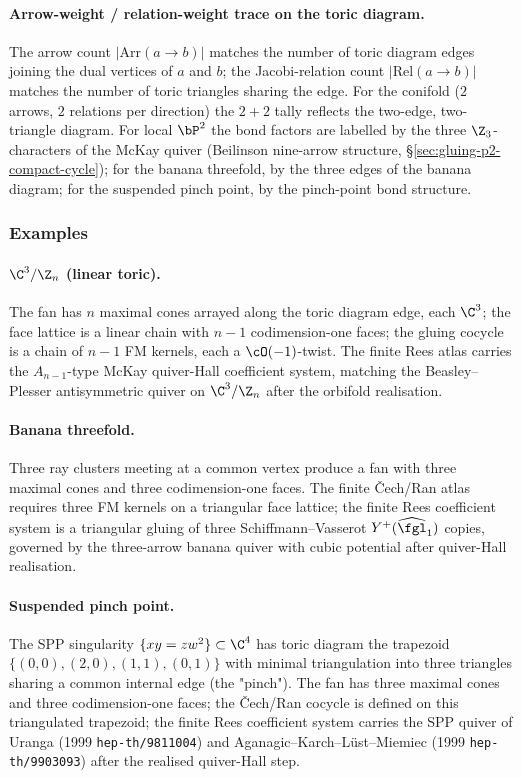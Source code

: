 \paragraph{Arrow-weight / relation-weight trace on the toric diagram.}
The arrow count $|\mathrm{Arr}(a \to b)|$ matches the number of toric
diagram edges joining the dual vertices of $a$ and $b$; the
Jacobi-relation count $|\mathrm{Rel}(a \to b)|$ matches the number of
toric triangles sharing the edge. For the conifold ($2$ arrows, $2$
relations per direction) the $2 + 2$ tally reflects the two-edge,
two-triangle diagram. For local $\bP^2$ the bond factors are labelled
by the three $\Z_3$-characters of the McKay quiver (Beilinson nine-arrow
structure, \S\ref{sec:gluing-p2-compact-cycle}); for the banana
threefold, by the three edges of the banana diagram; for the suspended
pinch point, by the pinch-point bond structure.

\subsubsection{Examples}

\paragraph{$\C^3/\Z_n$ (linear toric).}
The fan has $n$ maximal cones arrayed along the toric diagram edge, each
$\C^3$; the face lattice is a linear chain with $n - 1$ codimension-one
faces; the gluing cocycle is a chain of $n - 1$ FM kernels, each a
$\cO(-1)$-twist. The finite Rees atlas carries the $A_{n-1}$-type
McKay quiver-Hall coefficient system, matching the Beasley--Plesser
antisymmetric quiver on $\C^3/\Z_n$ after the orbifold realisation.

\paragraph{Banana threefold.}
Three ray clusters meeting at a common vertex produce a fan with three
maximal cones and three codimension-one faces. The finite \v{C}ech/Ran atlas
requires three FM kernels on a triangular face lattice; the finite Rees
coefficient system is a triangular gluing of three
Schiffmann--Vasserot $Y^+(\widehat{\fgl}_1)$ copies, governed by the
three-arrow banana quiver with cubic potential after quiver-Hall
realisation.

\paragraph{Suspended pinch point.}
The SPP singularity $\{xy = zw^2\} \subset \C^4$ has toric diagram the
trapezoid $\{(0,0), (2,0), (1,1), (0,1)\}$ with minimal triangulation
into three triangles sharing a common internal edge (the "pinch"). The
fan has three maximal cones and three codimension-one faces; the
\v{C}ech/Ran cocycle is defined on this triangulated trapezoid; the
finite Rees coefficient system carries the SPP quiver of Uranga (1999
\texttt{hep-th/9811004}) and Aganagic--Karch--L\"ust--Miemiec (1999
\texttt{hep-th/9903093}) after the realised quiver-Hall step.


